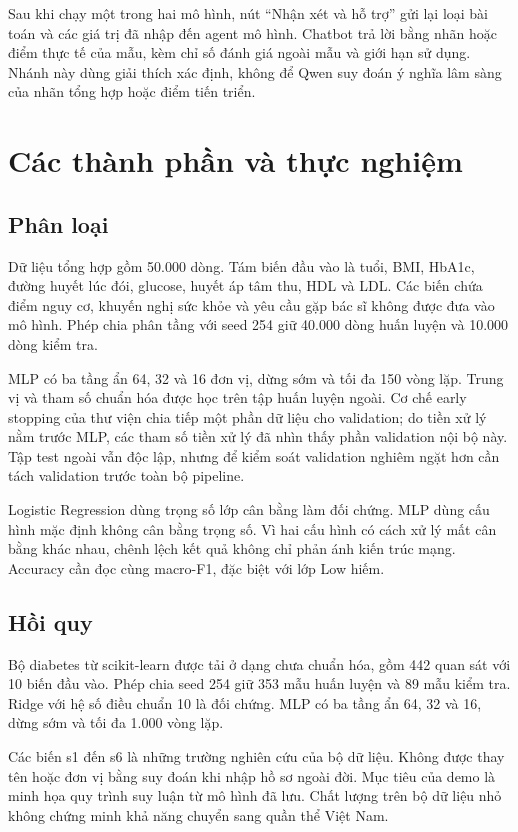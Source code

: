 Sau khi chạy một trong hai mô hình, nút ``Nhận xét và hỗ trợ'' gửi lại loại bài toán và các giá trị đã nhập đến agent mô hình. Chatbot trả lời bằng nhãn hoặc điểm thực tế của mẫu, kèm chỉ số đánh giá ngoài mẫu và giới hạn sử dụng. Nhánh này dùng giải thích xác định, không để Qwen suy đoán ý nghĩa lâm sàng của nhãn tổng hợp hoặc điểm tiến triển.
\chapter{Các thành phần và thực nghiệm}
\section{Phân loại}
Dữ liệu tổng hợp gồm 50.000 dòng. Tám biến đầu vào là tuổi, BMI, HbA1c, đường huyết lúc đói, glucose, huyết áp tâm thu, HDL và LDL. Các biến chứa điểm nguy cơ, khuyến nghị sức khỏe và yêu cầu gặp bác sĩ không được đưa vào mô hình. Phép chia phân tầng với seed 254 giữ 40.000 dòng huấn luyện và 10.000 dòng kiểm tra.

MLP có ba tầng ẩn 64, 32 và 16 đơn vị, dừng sớm và tối đa 150 vòng lặp. Trung vị và tham số chuẩn hóa được học trên tập huấn luyện ngoài. Cơ chế early stopping của thư viện chia tiếp một phần dữ liệu cho validation; do tiền xử lý nằm trước MLP, các tham số tiền xử lý đã nhìn thấy phần validation nội bộ này. Tập test ngoài vẫn độc lập, nhưng để kiểm soát validation nghiêm ngặt hơn cần tách validation trước toàn bộ pipeline.

Logistic Regression dùng trọng số lớp cân bằng làm đối chứng. MLP dùng cấu hình mặc định không cân bằng trọng số. Vì hai cấu hình có cách xử lý mất cân bằng khác nhau, chênh lệch kết quả không chỉ phản ánh kiến trúc mạng. Accuracy cần đọc cùng macro-F1, đặc biệt với lớp Low hiếm.
\section{Hồi quy}
Bộ diabetes từ scikit-learn được tải ở dạng chưa chuẩn hóa, gồm 442 quan sát với 10 biến đầu vào. Phép chia seed 254 giữ 353 mẫu huấn luyện và 89 mẫu kiểm tra. Ridge với hệ số điều chuẩn 10 là đối chứng. MLP có ba tầng ẩn 64, 32 và 16, dừng sớm và tối đa 1.000 vòng lặp.

Các biến s1 đến s6 là những trường nghiên cứu của bộ dữ liệu. Không được thay tên hoặc đơn vị bằng suy đoán khi nhập hồ sơ ngoài đời. Mục tiêu của demo là minh họa quy trình suy luận từ mô hình đã lưu. Chất lượng trên bộ dữ liệu nhỏ không chứng minh khả năng chuyển sang quần thể Việt Nam.
